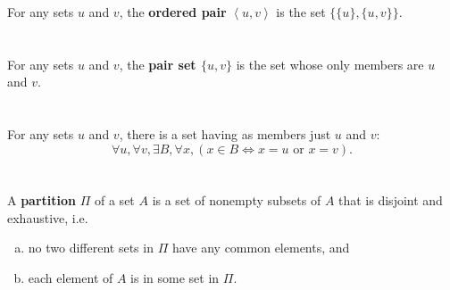 \documentclass{report}
\begin{document}
For any sets $u$ and $v$, the \textbf{ordered pair} $\left< u, v \right>$ is
  the set $\{\{u\}, \{u, v\}\}$.

\begin{definition}


\end{definition}

\section{}%
\label{ref:pair-set}

For any sets $u$ and $v$, the \textbf{pair set $\{u, v\}$} is the set whose
  only members are $u$ and $v$.

\begin{definition}

  \statementpadding



\end{definition}

\section{}%
\label{ref:pairing-axiom}

For any sets $u$ and $v$, there is a set having as members just $u$ and $v$:
  $$\forall u, \forall v, \exists B, \forall x,
      (x \in B \iff x = u \text{ or } x = v).$$

\begin{axiom}

  \statementpadding



\end{axiom}

\section{}%
\label{ref:partition}

A \textbf{partition} $\Pi$ of a set $A$ is a set of nonempty subsets of $A$ that
  is disjoint and exhaustive, i.e.
  \begin{enumerate}[(a)]
    \item no two different sets in $\Pi$ have any common elements, and
    \item each element of $A$ is in some set in $\Pi$.
  \end{enumerate}
\end{document}
